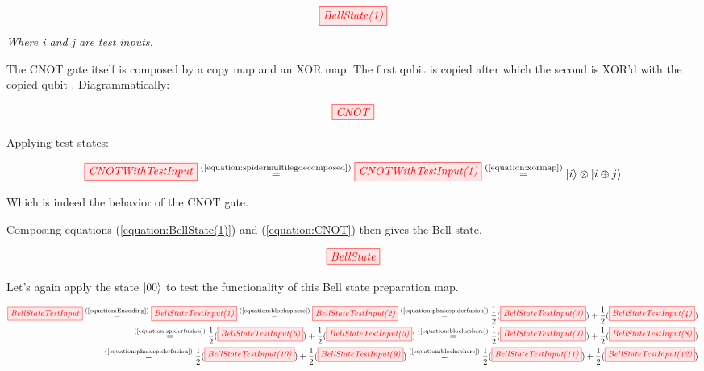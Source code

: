 \documentclass[]{article}
\newcommand{\equaltext}[1]{\ensuremath{\stackrel{\text{#1}}{=}}}
\begin{document}
\begin{equation}
	\label{equation:BellState(1)}
	\tikzfig{BellState(1)}
\end{equation}
\textit{Where i and j are test inputs.}

The CNOT gate itself is composed by a copy map and an XOR map. The first qubit is copied after which the second is XOR'd with the copied qubit \cite{articleCNOT}. Diagrammatically:

\begin{equation}
	\label{equation:CNOT}
	\tikzfig{CNOT}
\end{equation}

Applying test states:

\begin{equation}
	\tikzfig{CNOTWithTestInput} \equaltext{(\ref{equation:spidermultilegdecomposed})} \tikzfig{CNOTWithTestInput(1)} \equaltext{(\ref{equation:xormap})} \ket{i} \otimes \ket{i \oplus j}
\end{equation}

Which is indeed the behavior of the CNOT gate.

Composing equations (\ref{equation:BellState(1)}) and (\ref{equation:CNOT}) then gives the Bell state.

\begin{equation}
	\tikzfig{BellState}
\end{equation}

Let's again apply the state $\ket{00}$ to test the functionality of this Bell state preparation map.

\begin{equation}
\label{BellStateTestInput}
	\begin{split}
	\tikzfig{BellStateTestInput} \equaltext{(\ref{equation:Encoding})} \tikzfig{BellStateTestInput(1)} \equaltext{(\ref{equation:blochsphere})} \tikzfig{BellStateTestInput(2)} \equaltext{(\ref{equation:phasespiderfusion})}
	 \frac{1}{2}(\tikzfig{BellStateTestInput(3)})+
	\frac{1}{2}(\tikzfig{BellStateTestInput(4)}) 
 \\ \equaltext{(\ref{equation:spiderfusion})}
 	\frac{1}{2}(\tikzfig{BellStateTestInput(6)}) +
  \frac{1}{2}(\tikzfig{BellStateTestInput(5)}) 
	\equaltext{(\ref{equation:blochsphere})} \frac{1}{2}(\tikzfig{BellStateTestInput(7)}) + \frac{1}{2}(\tikzfig{BellStateTestInput(8)}) \\ \equaltext{(\ref{equation:phasespiderfusion})}
	\frac{1}{2}(\tikzfig{BellStateTestInput(10)}) +
	 \frac{1}{2}(\tikzfig{BellStateTestInput(9)}) 
	 \equaltext{(\ref{equation:blochsphere})} \frac{1}{2}(\tikzfig{BellStateTestInput(11)}) +
	\frac{1}{2}(\tikzfig{BellStateTestInput(12)})
	\end{split}
\end{equation}
\end{document}
